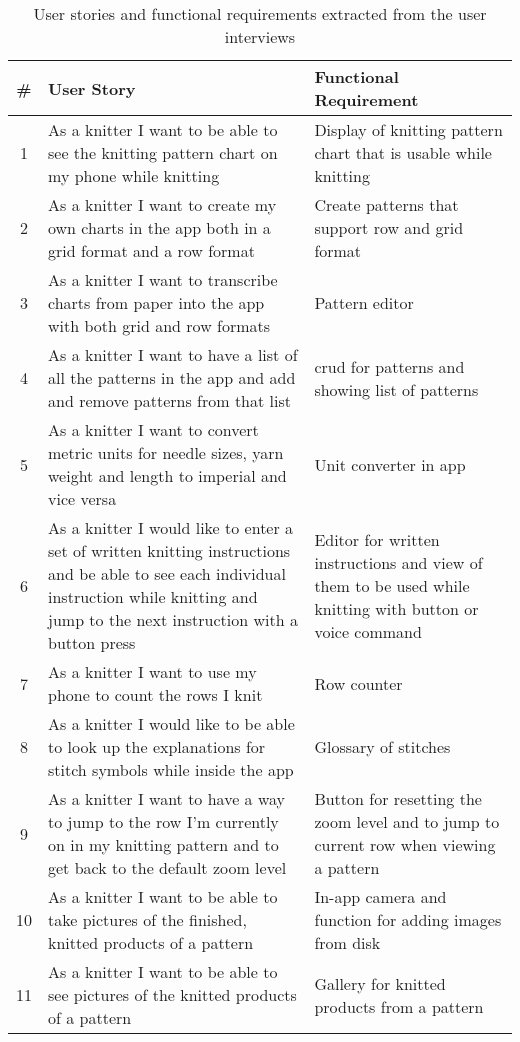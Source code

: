 \label{tabl:requirements}
\begin{longtable}{| c | p{6.5cm} | p{6.5cm} |}
	\caption{User stories and functional requirements extracted from the user interviews}\\
    \hline
   	\# & User Story & Functional Requirement \\ \hline
   	\endhead
    1 &	As a knitter I want to be able to see the knitting pattern chart on my phone while knitting &
	 Display of knitting pattern chart that is usable while knitting \\ \hline
	2 & As a knitter I want to create my own charts in the app both in a grid format and a row format & Create patterns that support row and grid format \\ \hline
	3 & As a knitter I want to transcribe charts from paper into the app with both grid and row formats & Pattern editor \\ \hline
	4 & As a knitter I want to have a list of all the patterns in the app and add and remove patterns from that list & \gls{crud} for patterns and showing list of patterns\\ \hline
	5 & As a knitter I want to convert metric units for needle sizes, yarn weight and length to imperial and vice versa & Unit converter in app  \\ \hline
	6 & As a knitter I would like to enter a set of written knitting instructions and be able to see each individual instruction while knitting and jump to the next instruction with a button press & Editor for written instructions and view of them to be used while knitting with button or voice command \\ \hline
	7 & As a knitter I want to use my phone to count the rows I knit & Row counter \\ \hline
	8 & As a knitter I would like to be able to look up the explanations for stitch symbols while inside the app & Glossary of stitches \\ \hline
	9 & As a knitter I want to have a way to jump to the row I'm currently on in my knitting pattern and to get back to the default zoom level & Button for resetting the zoom level and to jump to current row when viewing a pattern \\ \hline
	10 & As a knitter I want to be able to take pictures of the finished, knitted products of a pattern & In-app camera and function for adding images from disk \\ \hline
	11 & As a knitter I want to be able to see pictures of the knitted products of a pattern & Gallery for knitted products from a pattern \\ \hline

\end{longtable}
